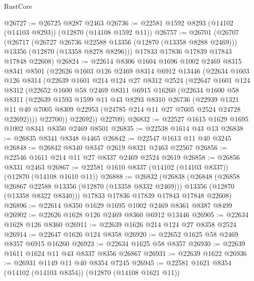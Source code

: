 \begin{lexlean}{RustCore}
\begin{coremodule}
@26727 := @26725 @8287 @2463
@26736 := @22581 @1592 @8293 (@14102 (@14103 @8293)) (@12870 (@14108 @1592 @11))
@26757 := @26701
    (@26707
      (@26717
        (@26727 @26736 @22588 @13356 (@12870 (@13358 @8288 @2469)))
        @13356
        (@12870 (@13358 @8278 @8296)))
      @17833
      @17836
      @17839
      @17843
      @17848
      @22608)
@26824 := @22614
    @8306
    @1604
    @1696
    @1002
    @2469
    @8315
    @8341
    @8501
    (@22626
      @1603
      @126
      @2469
      @8314
      @6912
      @13446
      (@22634
        @1603
        @126
        @8314
        (@22639
          @1601
          @214
          @124
          @27
          @8312
          @2524
          (@22647
            @1601
            @124
            @8312
            (@22652
              @1600
              @58
              @2469
              @8311
              @6915
              @16260
              (@22634
                @1600
                @58
                @8311
                (@22639
                  @1593
                  @1599
                  @11
                  @43
                  @8293
                  @8310
                  @26736
                  (@22939
                    @1321
                    @11
                    @40
                    @7005
                    @8309
                    @22953
                    (@24785 @214 @11 @27 @7605 @2524 @24728 @22692))))
              @22700))
          @22692))
      @22709)
@26832 := @22527 @1615 @1629 @1695 @1002 @8341 @8350 @2469 @8501
@26835 := @22538 @1614 @43 @13
@26838 := @26835 @8341 @8348 @4465
@26842 := @22547 @1613 @11 @40 @3245
@26848 := @26842 @8340 @8347 @2619 @8321 @2463 @22567
@26856 := @22546 @1611 @214 @11 @27 @8337 @2469 @2524 @2619
@26858 := @26856 @8331 @2463
@26867 := @22581 @1610 @8337 (@14102 (@14103 @8337)) (@12870 (@14108 @1610 @11))
@26888 := @26832
    (@26838
      (@26848
        (@26858 @26867 @22588 @13356 (@12870 (@13358 @8332 @2469)))
        @13356
        (@12870 (@13358 @8322 @8340)))
      @17833
      @17836
      @17839
      @17843
      @17848
      @22608)
@26896 := @22614 @8350 @1629 @1695 @1002 @2469 @8361 @8387 @8499
@26902 := @22626 @1628 @126 @2469 @8360 @6912 @13446
@26905 := @22634 @1628 @126 @8360
@26911 := @22639 @1626 @214 @124 @27 @8358 @2524
@26914 := @22647 @1626 @124 @8358
@26920 := @22652 @1625 @58 @2469 @8357 @6915 @16260
@26923 := @22634 @1625 @58 @8357
@26930 := @22639 @1611 @1624 @11 @43 @8337 @8356 @26867
@26931 := @22639 @1622
@26936 := @26931 @1149 @11 @40 @8354 @7245
@26945 := @22581 @1621 @8354 (@14102 (@14103 @8354)) (@12870 (@14108 @1621 @11))

\end{coremodule}
\end{lexlean}
